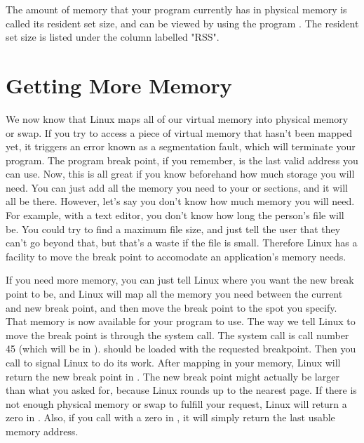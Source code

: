 \begin{sidebar}
The amount of memory that your program currently has in physical memory is called its
resident set size, and
can be viewed by using the program .  The resident set size
is listed under the column labelled "RSS".
\end{sidebar}

\section{Getting More Memory}
\label{dynamicmemory}

We now know that Linux maps all of our virtual memory into physical memory or
swap.  If you try to access a piece of virtual memory 
that hasn't been mapped yet,
it triggers an error known as a segmentation fault, which will terminate your 
program.  The program break point, if you remember, is the last valid address you
can use.  Now, this is all great if you know beforehand how much storage you will
need.  You can just add all the memory you need to your 
or  sections, and it will
all be there.  However, let's say you don't know how much memory you will need.  For example,
with a text editor, you don't know how long the person's file will be.  You could try
to find a maximum file size, and just tell the user that they can't go beyond that, but
that's a waste if the file is small.  Therefore Linux has a facility to move the break point
to accomodate an application's memory needs.

If you need more memory, you can just tell Linux where you want the new break point
to be, and Linux will map all the memory you need between the current and new break
point, and then move the break point to the spot you specify.  That memory is now
available for your program to use.  The
way we tell Linux to move the break point is through the 
system call.  The  system call is call number
45 (which will be in {\eaxReg}).  {\ebxReg} should be loaded with the requested breakpoint.  
Then you call  to signal Linux to do its work.  
After mapping in your memory, Linux will return the new break point in {\eaxReg}.
The new break point might actually be larger
than what you asked for, because Linux rounds up to the nearest page.  If there is
not enough physical memory or swap to fulfill your request, Linux will return a zero
in {\eaxReg}.  Also, if you call  with a zero in {\ebxReg}, it will
simply return the last usable memory address.


